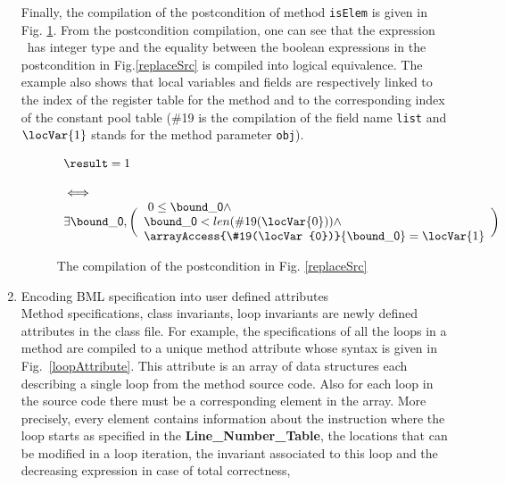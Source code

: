 \begin{enumerate}
Finally, the compilation of the postcondition of method \texttt{isElem} is given in Fig. \ref{postCompile}. From the postcondition compilation,
 one can see that the expression \result \ has integer type and the equality between the boolean expressions in the postcondition in Fig.\ref{replaceSrc} is
 compiled into logical equivalence. The example also 
shows that local variables and  fields are respectively linked to the index of the register table for the method and to the corresponding 
index of the constant pool table 
(\#19 is the compilation of the field name \texttt{list} and $\locVar{1}$ stands for the method parameter \texttt{obj}). 

\begin{figure}[t]
 $$\begin{array}{l}
         \result = 1 \\
          \\ 
         \iff \\ 
         \exists    \bound\_{\mbox{\rm \textsf{0}}}, 
           \biggl(\begin{array}{l} \ 0 \leq  \bound\_{\mbox{\rm \textsf{0}}} \wedge\\ 
             \bound\_{\mbox{\rm \textsf{0}}} < len(\#19(\locVar{0})) \wedge \\
             \arrayAccess{\#19(\locVar{0})}{\bound\_{\mbox{\rm \textsf{0}}} } = \locVar{1} 
         \end{array} \biggr) 
   \end{array}
$$
\caption{\sc The compilation of the postcondition in Fig. \ref{replaceSrc}}
\label{postCompile}
\end{figure}





\item Encoding BML specification  into user defined attributes\\
 Method specifications, class invariants, loop invariants are newly defined attributes in the class file.
 For example, the specifications of all the loops in a method are compiled to a unique method attribute whose syntax is
 given in Fig.~\ref{loopAttribute}. This attribute is an array of data structures each describing a single loop from the method source code.
 Also for each loop in the source code there must be a corresponding element in the array. 
More precisely, every element contains information about the instruction where the loop starts as specified in the
\textbf{Line\_Number\_Table}, the locations that can be modified in a loop iteration, 
 the invariant associated to this loop and the decreasing expression in case of total correctness, 
\end{enumerate}

